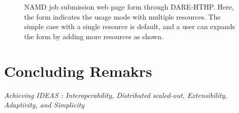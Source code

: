 \documentclass{sig-alternate}
\begin{document}
\begin{figure}
 \centering
\caption{\small NAMD job submission web page form through DARE-HTHP. Here, the form indicates the usage mode with multiple resources.  The simple case with a single resource is default, and a user can expands the form by adding more resources as shown.}
  \label{fig:NAMD2}
\end{figure}


\section{Concluding Remakrs}

\textit{Achieving IDEAS : Interoperability, Distributed
  scaled-out, Extensibility, Adaptivity, and Simplicity}
\end{document}
